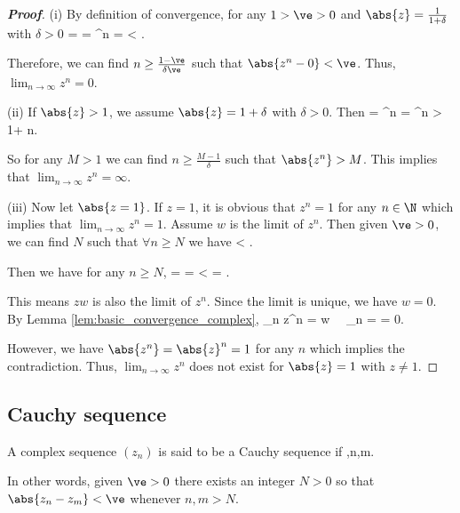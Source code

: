 \begin{proof}[\bf Proof]
\ben
\item [(i)] By definition of convergence, for any $1>\ve>0$ and $\abs{z} = \frac 1{1+\delta}$ with $\delta>0$
\be
{} =  = ^n =  < .
\ee

Therefore, we can find $n\geq \frac {1-\ve}{\delta\ve}$ such that $\abs{z^n-0}<\ve$. Thus, $\lim_{n\to\infty} z^n = 0$.


\item [(ii)] If $\abs{z} >1$, we assume $\abs{z} = 1+\delta$ with $\delta >0$. Then
\be
{} = ^n = ^n > 1+ n\delta.
\ee

So for any $M>1$ we can find $n \geq \frac{M-1}{\delta}$ such that $\abs{z^n} > M$. This implies that $\lim_{n\to \infty}z^n = \infty$.

\item [(iii)] Now let $\abs{z=1}$. If $z=1$, it is obvious that $z^n = 1$ for any $n\in \N$ which implies that $\lim_{n\to \infty}z^n = 1$. Assume $w$ is the limit of $z^n$. Then given $\ve>0$, we can find $N$ such that $\forall n\geq N$ we have
\be
{} < \ve.
\ee

Then we have for any $n\geq N$,
\be
{} =  =  < \ve = \ve .
\ee

This means $zw$ is also the limit of $z^n$. Since the limit is unique, we have $w =0$. By Lemma \ref{lem:basic_convergence_complex}, %
\be
\lim_{n\to\infty} z^n = w \ \ra\ \lim_{n\to\infty}  =  = 0.
\ee

However, we have $\abs{z^n} = \abs{z}^n = 1$ for any $n$ which implies the contradiction. Thus, $\lim_{n\to\infty} z^n $ does not exist for $\abs{z}=1$ with $z\neq 1$.
\een
\end{proof}


\subsection{Cauchy sequence}

\begin{definition}
A complex sequence $(z_n)$ is said to be a Cauchy sequence if
\be
{} ,\qquad {}n,m\to \infty.
\ee

In other words, given $\ve>0$ there exists an integer $N>0$ so that $\abs{z_n-z_m}<\ve$ whenever $n,m>N$.
\end{definition}

